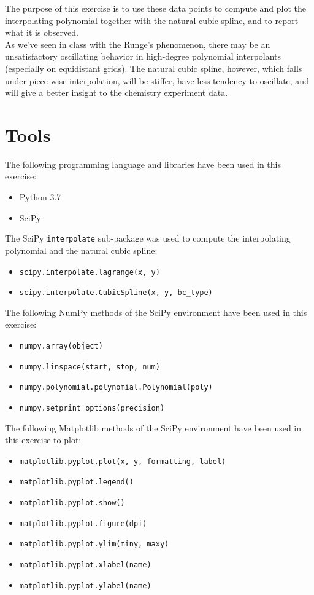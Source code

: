 \documentclass{article}
\newcommand{\code}{\texttt}
\begin{document}
The purpose of this exercise is to use these data points to compute and plot the interpolating polynomial together with the natural cubic spline, and to report what it is observed.\\

As we've seen in class with the Runge's phenomenon, there may be an unsatisfactory oscillating behavior in high-degree polynomial interpolants (especially on equidistant grids). The natural cubic spline, however, which falls under piece-wise interpolation, will be stiffer, have less tendency to oscillate, and will give a better insight to the chemistry experiment data. 

\section{Tools}
The following programming language and libraries have been used in this exercise:
\begin{itemize}
  \item Python 3.7
  \item SciPy
\end{itemize}
The SciPy \code{interpolate} sub-package was used to compute the interpolating polynomial and the natural cubic spline:
\begin{itemize}
  \item \code{scipy.interpolate.lagrange(x, y)}
  \item \code{scipy.interpolate.CubicSpline(x, y, bc\_type)}
\end{itemize}

The following NumPy methods of the SciPy environment have been used in this exercise:
\begin{itemize}
  \item \code{numpy.array(object)}
  \item \code{numpy.linspace(start, stop, num)}
  \item \code{numpy.polynomial.polynomial.Polynomial(poly)}
  \item \code{numpy.setprint\_options(precision)}
  \end{itemize}
The following Matplotlib methods of the SciPy environment have been used in this exercise to plot:
 \begin{itemize}
  \item \code{matplotlib.pyplot.plot(x, y, formatting, label)}
  \item \code{matplotlib.pyplot.legend()}
  \item \code{matplotlib.pyplot.show()}
  \item \code{matplotlib.pyplot.figure(dpi)}
  \item \code{matplotlib.pyplot.ylim(miny, maxy)}
  \item \code{matplotlib.pyplot.xlabel(name)}
  \item \code{matplotlib.pyplot.ylabel(name)}
  \end{itemize}
  
\end{document}
